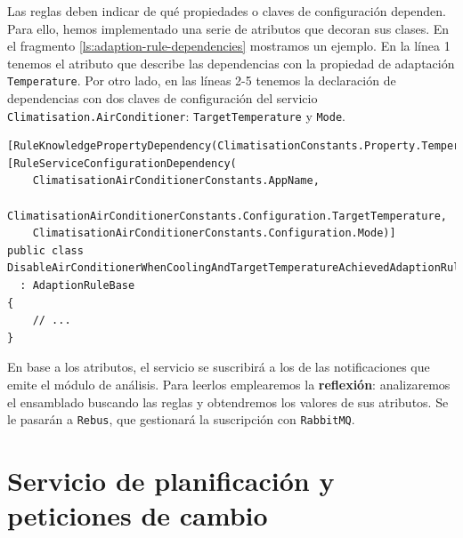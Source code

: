 
Las reglas deben indicar de qué propiedades o claves de configuración dependen. Para ello, hemos implementado una serie de atributos que decoran sus clases. En el fragmento \ref{ls:adaption-rule-dependencies} mostramos un ejemplo. En la línea 1 tenemos el atributo que describe las dependencias con la propiedad de adaptación \texttt{Temperature}. Por otro lado, en las líneas 2-5 tenemos la declaración de dependencias con dos claves de configuración del servicio \texttt{Climatisation.AirConditioner}: \texttt{TargetTemperature} y \texttt{Mode}.

\begin{lstlisting}[caption={Las reglas declaran sus dependencias sobre propiedades de adaptación usando atributos. Estos se utilizarán para las suscripciones a los temas de los eventos.\protect\footnotemark},captionpos=b, label=ls:adaption-rule-dependencies]
[RuleKnowledgePropertyDependency(ClimatisationConstants.Property.Temperature)]
[RuleServiceConfigurationDependency(
    ClimatisationAirConditionerConstants.AppName,
    ClimatisationAirConditionerConstants.Configuration.TargetTemperature,
    ClimatisationAirConditionerConstants.Configuration.Mode)]
public class DisableAirConditionerWhenCoolingAndTargetTemperatureAchievedAdaptionRule
  : AdaptionRuleBase
{
    // ...
}
\end{lstlisting}


En base a los atributos, el servicio se suscribirá a los  de las notificaciones que emite el módulo de análisis. Para leerlos emplearemos la \textbf{reflexión}: analizaremos el ensamblado buscando las reglas y obtendremos los valores de sus atributos. Se le pasarán a \texttt{Rebus}, que gestionará la suscripción con \texttt{RabbitMQ}.

\section{Servicio de planificación y peticiones de cambio}

